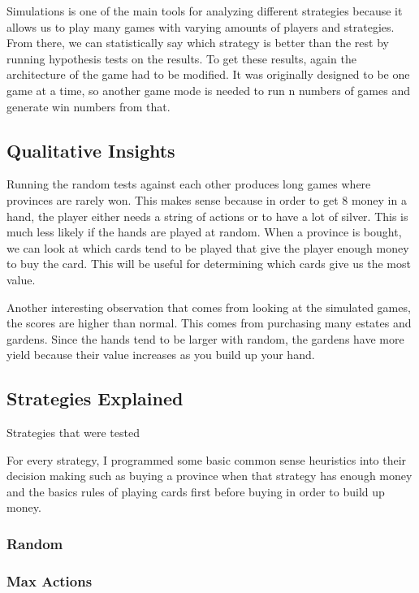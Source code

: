 \documentclass[11pt, oneside]{article}   	%
\begin{document}
Simulations is one of the main tools for analyzing different strategies because it allows us to play many games with varying amounts of players and strategies. From there, we can statistically say which strategy is better than the rest by running hypothesis tests on the results. To get these results, again the architecture of the game had to be modified. It was originally designed to be one game at a time, so another game mode is needed to run n numbers of games and generate win numbers from that. 

\subsection{Qualitative Insights}

Running the random tests against each other produces long games where provinces are rarely won. This makes sense because in order to get 8 money in a hand, the player either needs a string of actions or to have a lot of silver. This is much less likely if the hands are played at random. When a province is bought, we can look at which cards tend to be played that give the player enough money to buy the card. This will be useful for determining which cards give us the most value. 

Another interesting observation that comes from looking at the simulated games, the scores are higher than normal. This comes from purchasing many estates and gardens. Since the hands tend to be larger with random, the gardens have more yield because their value increases as you build up your hand.

\subsection{Strategies Explained}

Strategies that were tested 

For every strategy, I programmed some basic common sense heuristics into their decision making such as buying a province when that strategy has enough money and the basics rules of playing cards first before buying in order to build up money. 

\subsubsection{Random}

\subsubsection{Max Actions}
\end{document}
